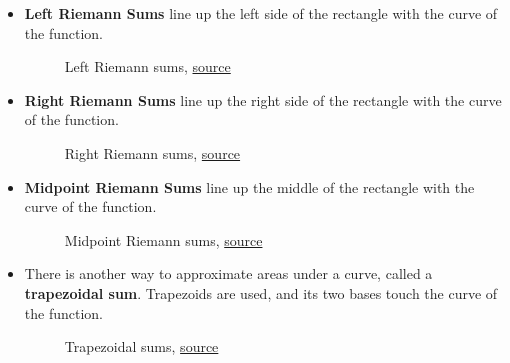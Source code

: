 \documentclass[12pt]{article}
\begin{document}
\begin{itemize}
    \item \textbf{Left Riemann Sums} line up the left side of the rectangle with the curve of the function.
          \begin{figure}[H]
              \begin{center}
                  \caption{Left Riemann sums, \href{https://www.khanacademy.org/math/ap-calculus-bc/bc-integration-new/bc-6-2/a/riemann-sums-review?modal=1}{source}}
              \end{center}
          \end{figure}

    \item \textbf{Right Riemann Sums} line up the right side of the rectangle with the curve of the function.
          \begin{figure}[H]
              \begin{center}
                  \caption{Right Riemann sums, \href{https://www.khanacademy.org/math/ap-calculus-bc/bc-integration-new/bc-6-2/a/riemann-sums-review?modal=1}{source}}
              \end{center}
          \end{figure}

    \item \textbf{Midpoint Riemann Sums} line up the middle of the rectangle with the curve of the function.
          \begin{figure}[H]
              \begin{center}
                  \caption{Midpoint Riemann sums, \href{https://www.khanacademy.org/math/ap-calculus-bc/bc-integration-new/bc-6-2/a/riemann-sums-review?modal=1}{source}}
              \end{center}
          \end{figure}

    \item There is another way to approximate areas under a curve, called a \textbf{trapezoidal sum}. Trapezoids are used, and its two bases touch the curve of the function.
          \begin{figure}[H]
              \begin{center}
                  \caption{Trapezoidal sums, \href{https://www.khanacademy.org/math/ap-calculus-bc/bc-integration-new/bc-6-2/a/riemann-sums-review?modal=1}{source}}
              \end{center}
          \end{figure}
\end{itemize}
\end{document}
